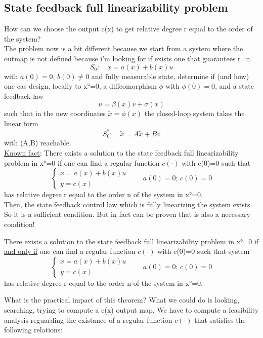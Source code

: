 \subsection{State feedback full linearizability problem}
 How can we choose the output c(x) to get relative degree r equal to the order of the system?\\
 The problem now is a bit different because we start from a system where the outmap is not defined because i'm looking for if exists one that guarantees r=n.
 \[S_0:\quad \dot{x}=a(x)+b(x)u\] with $a(0)=0, \, b(0)\ne0$ and fully measurable state, determine if (and how) one cas design, locally to x°=0, a diffeomorphism $\phi$ with $\phi(0)=0$, and a state feedback law \[u=\beta(x)v+\sigma(x)\] such that in the new coordinates $\tilde{x}=\phi(x)$ the closed-loop system takes the linear form \[S^*_0: \quad \dot{\tilde{x}}=A\tilde{x}+Bv\] with (A,B) reachable.\\
 \underline{Known fact}: There exists a solution to the state feedback full linearizability problem in x°=0 if one can find a regular function $c(\cdot)$ with c(0)=0 such that
 \begin{equation*}
 	\left\{
 	\begin{array}{ll}	
 		\dot{x}=a(x)+b(x)u\\
 		y=c(x)
 	\end{array}
 	\right. \qquad a(0)=0;\, c(0)=0
 \end{equation*}
 has relative degree r equal to the order n of the system in x°=0.\\
 Then, the state feedback control law which is fully linearizing the system exists. So it is a sufficient condition. But in fact can be proven that is also a necessary condition!
 \begin{thm}
 	There exists a solution to the state feedback full linearizability problem in x°=0 \underline{if and only if} one can find a regular function $c(\cdot)$ with c(0)=0 such that system
 	 \begin{equation*}
 		\left\{
 		\begin{array}{ll}	
 			\dot{x}=a(x)+b(x)u\\
 			y=c(x)
 		\end{array}
 		\right. \qquad a(0)=0;\, c(0)=0
 	\end{equation*} has relative degree r equal to the order n of the system in x°=0.
 \end{thm}
What is the practical impact of this theorem? What we could do is looking, searching, trying to compute a c(x) output map. We have to compute a feasibility analysis reguarding the existance of a regular function $c(\cdot)$ that satisfies the following relations:
